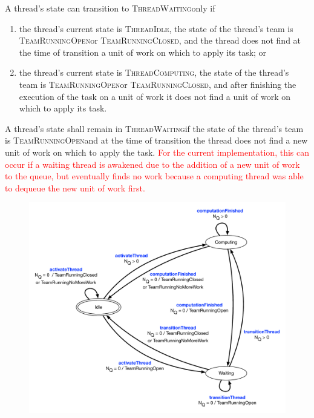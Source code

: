 \documentclass{article}
\newcommand{\TeamRunningOpen}   {\textsc{TeamRunningOpen}}
\newcommand{\TeamRunningClosed} {\textsc{TeamRunningClosed}}
\newcommand{\ThreadIdle}        {\textsc{ThreadIdle}}
\newcommand{\ThreadComputing}   {\textsc{ThreadComputing}}
\newcommand{\ThreadWaiting}     {\textsc{ThreadWaiting}}
\begin{document}
A thread's state can transition to \ThreadWaiting only if
\begin{enumerate}
\item{the thread's current state is \ThreadIdle, the state of the thread's team
is \TeamRunningOpen or \TeamRunningClosed, and the thread does not find at the
time of transition a unit of work on which to apply its task; or}
\item{the thread's current state is \ThreadComputing, the state of the thread's
team is \TeamRunningOpen or \TeamRunningClosed, and after finishing the
execution of the task on a unit of work it does not find a unit of work on which
to apply its task.}
\end{enumerate}
A thread's state shall remain in \ThreadWaiting if the state of the thread's
team is \TeamRunningOpen and at the time of transition the thread does not find 
a new unit of work on which to apply the task.  \textcolor{red}{For the current
implementation, this can occur if a waiting thread is awakened due to the
addition of a new unit of work to the queue, but eventually finds no work
because a computing thread was able to dequeue the new unit of work first.}\\

\begin{figure}[!hp]
\begin{center}
\includegraphics[width=6.5in]{ThreadStatesPersistent.pdf}
\caption[]{}
\label{fig:ThreadStateDiagram}
\end{center}
\end{figure}
\end{document}
